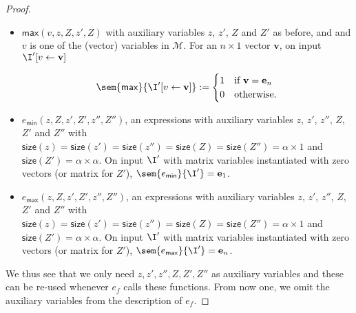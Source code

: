 \begin{proof}
\begin{itemize}
	\item $\textsf{max}(v,z,Z,z',Z)$ with auxiliary variables $z$, $z'$, $Z$ and $Z'$ as before, and 
	and $v$ is one of the (vector) variables in $\mathcal{M}$. For an $n\times 1$ vector $\mathbf{v}$, 
	on input $\I'[v\gets \mathbf{v}]$
	
	$$\sem{\mathsf{max}}{\I'[v\gets\mathbf{v}]}:=\begin{cases} 1 & \text{if $\mathbf{v}=\mathbf{e}_{n}$}\\
		0 & \text{otherwise}.
		\end{cases}$$
	\item $e_{\mathsf{min}}(z,Z,z',Z',z'',Z'')$, an expressions with
	auxiliary variables $z$, $z'$, $z''$, $Z$, $Z'$ and $Z''$ with 
	$\mathsf{size}(z)=\mathsf{size}(z')=\mathsf{size}(z'')=\mathsf{size}(Z)=\mathsf{size}(Z'')=\alpha\times 1$ 
	and $\mathsf{size}(Z')=\alpha\times\alpha$. On input $\I'$ with 
	matrix variables instantiated with zero vectors (or matrix for $Z'$),
 	 $\sem{e_{\mathsf{min}}}{\I'}=\mathbf{e}_1$. 
	\item $e_{\mathsf{max}}(z,Z,z',Z',z'',Z'')$, an expressions with
	auxiliary variables $z$, $z'$, $z''$, $Z$, $Z'$ and $Z''$ with 
	$\mathsf{size}(z)=\mathsf{size}(z')=\mathsf{size}(z'')=\mathsf{size}(Z)=\mathsf{size}(Z'')=\alpha\times 1$ 
	and $\mathsf{size}(Z')=\alpha\times\alpha$. On input $\I'$ with 
	matrix variables instantiated with zero vectors (or matrix for $Z'$),
 	 $\sem{e_{\mathsf{max}}}{\I'}=\mathbf{e}_n$. 	 		
\end{itemize}
We thus see that we only need $z,z',z'',Z,Z',Z''$ as auxiliary variables and these can be re-used 
whenever $e_f$ calls these functions. From now one, we omit the auxiliary variables from the description 
of $e_f$.



\end{proof}
